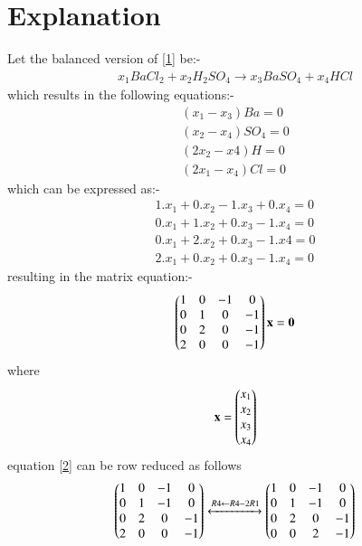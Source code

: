 \documentclass[journal,12pt,twocolumn]{IEEEtran}
\begin{document}
\section{Explanation}
Let the balanced version of \eqref{1} be:-
\begin{align}\label{3}
x_1BaCl_2 + x_2H_2SO_4 \xrightarrow{} x_3BaSO_4 + x_4HCl
\end{align}
which results in the following equations:-
\begin{equation}
 \begin{aligned}
    (x_1-x_3)Ba=0\\
    (x_2-x_4)SO_4=0\\
    (2x_2-x4)H=0\\
    (2x_1-x_4)Cl=0
 \end{aligned}
\end{equation}
which can be expressed as:-
\begin{equation}
 \begin{aligned}
    1.x_1 + 0.x_2 - 1.x_3 + 0.x_4=0\\
    0.x_1 + 1.x_2 + 0.x_3 - 1.x_4=0\\
    0.x_1 + 2.x_2 + 0.x_3 - 1.x4=0\\
    2.x_1 + 0.x_2 + 0.x_3 - 1.x_4=0
 \end{aligned}
\end{equation}
resulting in the matrix equation:-
\begin{align}\label{2}
    \begin{pmatrix}1 & 0 & -1 & 0\\0 & 1 & 0 & -1\\0 & 2 & 0 & -1\\2 & 0 & 0 & -1\end{pmatrix}\mathbf{x}=\mathbf{0}
\end{align}
where
\begin{align}
    \mathbf{x}=\begin{pmatrix}x_1\\x_2\\x_3\\x_4\end{pmatrix}
\end{align}
equation \eqref{2} can be row reduced as follows
\begin{align}
   \begin{pmatrix}
 1 & 0 & -1 & 0\\  
 0 & 1 & -1 & 0\\
 0 & 2 & 0 & -1\\
 2 & 0 & 0 & -1
\end{pmatrix}\xleftrightarrow[]{R4\leftarrow R4-2R1}\begin{pmatrix}
1 & 0 & -1 & 0\\
0 & 1 & -1 & 0\\
0 & 2 & 0 & -1\\
0 & 0 & 2 & -1\end{pmatrix}
\end{align}
\end{document}
